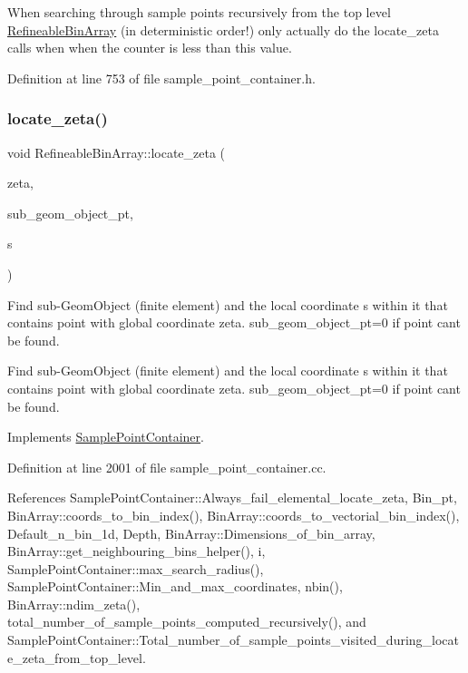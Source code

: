 When searching through sample points recursively from the top level \hyperlink{classRefineableBinArray}{Refineable\+Bin\+Array} (in deterministic order!) only actually do the locate\+\_\+zeta calls when when the counter is less than this value. 



Definition at line 753 of file sample\+\_\+point\+\_\+container.\+h.

\mbox{\label{classRefineableBinArray_a4f2f78efe9b05fda23d94e857d00cfa1}} 
\subsubsection{\texorpdfstring{locate\+\_\+zeta()}{locate\_zeta()}}
{\footnotesize\ttfamily void Refineable\+Bin\+Array\+::locate\+\_\+zeta (\begin{DoxyParamCaption}\item[{const Vector$<$ double $>$ \&}]{zeta,  }\item[{Geom\+Object $\ast$\&}]{sub\+\_\+geom\+\_\+object\+\_\+pt,  }\item[{Vector$<$ double $>$ \&}]{s }\end{DoxyParamCaption})\hspace{0.3cm}{\ttfamily [virtual]}}



Find sub-\/\+Geom\+Object (finite element) and the local coordinate s within it that contains point with global coordinate zeta. sub\+\_\+geom\+\_\+object\+\_\+pt=0 if point can\textquotesingle{}t be found. 

Find sub-\/\+Geom\+Object (finite element) and the local coordinate s within it that contains point with global coordinate zeta. sub\+\_\+geom\+\_\+object\+\_\+pt=0 if point can\textquotesingle{}t be found. 

Implements \hyperlink{classSamplePointContainer_acca8dbae8346d6c8924b1f815aa5f049}{Sample\+Point\+Container}.



Definition at line 2001 of file sample\+\_\+point\+\_\+container.\+cc.



References Sample\+Point\+Container\+::\+Always\+\_\+fail\+\_\+elemental\+\_\+locate\+\_\+zeta, Bin\+\_\+pt, Bin\+Array\+::coords\+\_\+to\+\_\+bin\+\_\+index(), Bin\+Array\+::coords\+\_\+to\+\_\+vectorial\+\_\+bin\+\_\+index(), Default\+\_\+n\+\_\+bin\+\_\+1d, Depth, Bin\+Array\+::\+Dimensions\+\_\+of\+\_\+bin\+\_\+array, Bin\+Array\+::get\+\_\+neighbouring\+\_\+bins\+\_\+helper(), i, Sample\+Point\+Container\+::max\+\_\+search\+\_\+radius(), Sample\+Point\+Container\+::\+Min\+\_\+and\+\_\+max\+\_\+coordinates, nbin(), Bin\+Array\+::ndim\+\_\+zeta(), total\+\_\+number\+\_\+of\+\_\+sample\+\_\+points\+\_\+computed\+\_\+recursively(), and Sample\+Point\+Container\+::\+Total\+\_\+number\+\_\+of\+\_\+sample\+\_\+points\+\_\+visited\+\_\+during\+\_\+locate\+\_\+zeta\+\_\+from\+\_\+top\+\_\+level.

